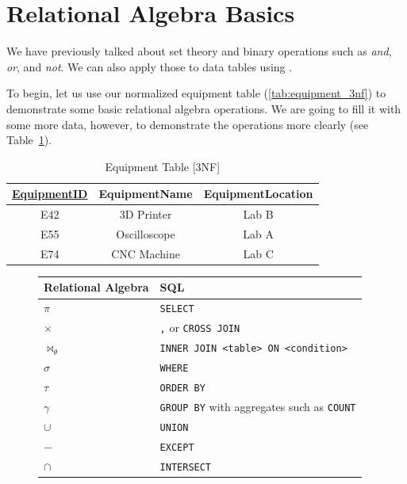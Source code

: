 \section{Relational Algebra Basics}
We have previously talked about set theory and binary operations such as \textit{and}, \textit{or}, and \textit{not}. We can also apply those to data tables using .

To begin, let us use our normalized equipment table (\ref{tab:equipment_3nf}) to demonstrate some basic relational algebra operations. We are going to fill it with some more data, however, to demonstrate the operations more clearly (see Table~\ref{tab:equipment_expanded}).

\begin{table}[H]
\centering
\begin{tabular}{|c|c|c|}
\hline
{\underline{EquipmentID}} & {EquipmentName} & {EquipmentLocation}  \\
\hline
E42 & 3D Printer & Lab B \\
\hline
E55 & Oscilloscope & Lab A \\
\hline
E74 & CNC Machine & Lab C \\
\hline
\end{tabular}
\caption{Equipment Table [3NF]}
\label{tab:equipment_expanded}
\end{table}

\begin{figure}[H]
    \centering
    \begin{table}[H]
        \centering
        \begin{tabular}{|l|l|}
        \hline
            Relational Algebra & SQL \\ \hline
            $\pi$ & \texttt{SELECT} \\ \hline
            $\times$ & \texttt{,} or \texttt{CROSS JOIN} \\ \hline
            $\bowtie_{\theta}$ & \texttt{INNER JOIN <table> ON <condition>} \\ \hline
            $\sigma$ & \texttt{WHERE} \\ \hline
            $\tau$ & \texttt{ORDER BY} \\ \hline
            $\gamma$ & \texttt{GROUP BY} with aggregates such as \texttt{COUNT} \\ \hline
            $\cup$ & \texttt{UNION} \\ \hline
            $-$ & \texttt{EXCEPT} \\ \hline
            $\cap$ & \texttt{INTERSECT} \\ \hline
        \end{tabular}
    \end{table}
    \label{tab:rel_alg_sql}
\end{figure}

